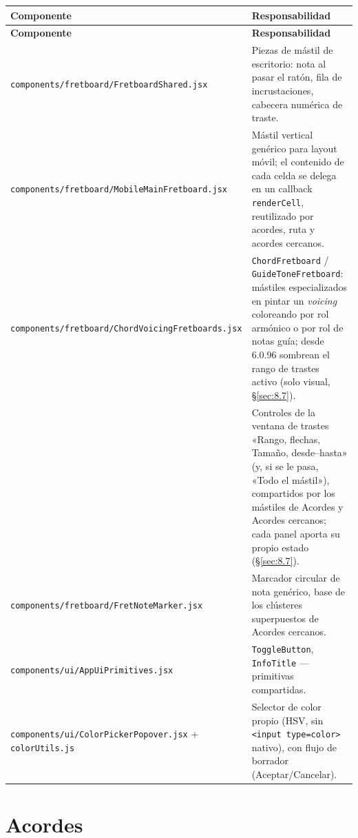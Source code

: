 \documentclass[a4paper,11pt,oneside]{report}
\newcommand{\Sref}[1]{\S\ref{#1}}
\begin{document}
\begin{center}
\begin{longtable}{L{5.0cm}L{9.3cm}}
\toprule
{}\textbf{Componente} & \textbf{Responsabilidad}\\
\midrule
\endfirsthead
{}\textbf{Componente} & \textbf{Responsabilidad}\\
\midrule
\endhead
\bottomrule
\endlastfoot
\lstinline!components/fretboard/FretboardShared.jsx! & Piezas de mástil de escritorio: nota al pasar el ratón, fila de incrustaciones, cabecera numérica de traste.\\
\lstinline!components/fretboard/MobileMainFretboard.jsx! & Mástil vertical genérico para layout móvil; el contenido de cada celda se delega en un callback \lstinline!renderCell!, reutilizado por acordes, ruta y acordes cercanos.\\
\lstinline!components/fretboard/ChordVoicingFretboards.jsx! & \lstinline!ChordFretboard! / \lstinline!GuideToneFretboard!: mástiles especializados en pintar un \textit{voicing} coloreando por rol armónico o por rol de notas guía; desde 6.0.96 sombrean el rango de trastes activo (solo visual, \Sref{sec:8.7}).\\
\texttt{} & Controles de la ventana de trastes «Rango, flechas, Tamaño, desde--hasta» (y, si se le pasa, «Todo el mástil»), compartidos por los mástiles de Acordes y Acordes cercanos; cada panel aporta su propio estado (\Sref{sec:8.7}).\\
\lstinline!components/fretboard/FretNoteMarker.jsx! & Marcador circular de nota genérico, base de los clústeres superpuestos de Acordes cercanos.\\
\lstinline!components/ui/AppUiPrimitives.jsx! & \lstinline!ToggleButton!, \lstinline!InfoTitle! --- primitivas compartidas.\\
\lstinline!components/ui/ColorPickerPopover.jsx! + \lstinline!colorUtils.js! & Selector de color propio (HSV, sin \lstinline!<input type=color>! nativo), con flujo de borrador (Aceptar/Cancelar).\\
\end{longtable}
\end{center}

\section{Acordes}
\label{sec:5.3}
\end{document}
